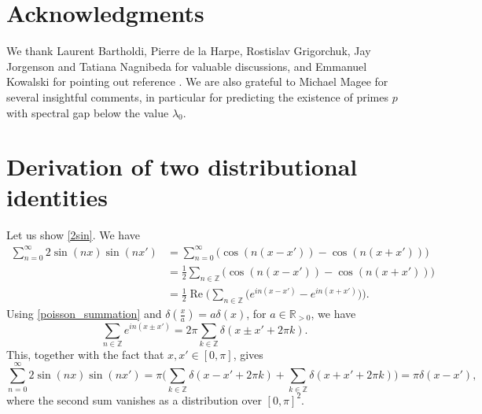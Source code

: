 \documentclass[11pt]{amsart}
\newcommand{\Z}{\mathbb{Z}}
\newcommand{\R}{\mathbb{R}}
\theoremstyle{definition}
\theoremstyle{remark}
\theoremstyle{plain}
\numberwithin{equation}{section}
\numberwithin{lemma}{section}
\numberwithin{definition}{section}
\numberwithin{proposition}{section}
\numberwithin{corollary}{section}
\numberwithin{theorem}{section}
\numberwithin{remark}{section}
\begin{document}
\section*{Acknowledgments} 
We thank Laurent Bartholdi, Pierre de la Harpe, Rostislav Grigorchuk, Jay Jorgenson and Tatiana Nagnibeda for valuable discussions, and Emmanuel Kowalski for pointing out reference \cite{MR4418463}. We are also grateful to Michael Magee for several insightful comments, in particular for predicting the existence of primes $p$ with spectral gap below the value $\lambda_0$.

\appendix
\section{Derivation of two distributional identities} \label{appA}

Let us show \eqref{2sin}. We have
\begin{align*}
 \sum_{n=0}^\infty 2\sin(nx)\sin(nx') &= \sum_{n=0}^\infty \big( \cos(n(x-x'))-\cos(n(x+x')) \big) \\
 &= \frac{1}{2} \sum_{n\in\Z} \big( \cos(n(x-x'))-\cos(n(x+x')) \big) \\ 
 &= \frac{1}{2} \operatorname{Re} \Big( \sum_{n\in\Z} \big(e^{in(x-x')}-e^{in(x+x')}\big) \Big).
\end{align*} 
Using \eqref{poisson_summation} and $\delta(\frac{x}{a})=a\delta(x)$, for $a\in \R_{>0}$, we have 
\begin{equation} \label{poisson1}
 \sum_{n\in\Z}e^{in(x\pm x')}=2\pi\sum_{k\in\Z}\delta(x\pm x'+2\pi k).
\end{equation}
This, together with the fact that $x,x'\in[0,\pi]$, gives
\begin{equation} \label{dist1}
 \sum_{n=0}^\infty 2\sin(nx)\sin(nx') = \pi \big( \sum_{k\in\Z}\delta(x-x'+2\pi k) + \sum_{k\in\Z}\delta(x+x'+2\pi k) \big)=\pi \delta(x-x'),
\end{equation}
where the second sum vanishes as a distribution over $[0,\pi]^2$.
\end{document}
